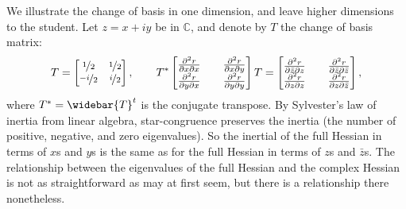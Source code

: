 \documentclass[12pt,openany]{book}
\newcommand{\C}{{\mathbb{C}}}
\theoremstyle{plain}
\theoremstyle{remark}
\theoremstyle{definition}
\theoremstyle{exercise}
\theoremstyle{example}
\begin{document}
We illustrate the change of basis in one dimension, and leave higher
dimensions to the student.  Let $z =
x+iy$ be in $\C$, and denote by $T$ the change of basis matrix:
\begin{equation*}
T =
\begin{bmatrix}
\nicefrac{1}{2} & \nicefrac{1}{2} \\
\nicefrac{-i}{2} & \nicefrac{i}{2}
\end{bmatrix}
,
\qquad
T^*
\begin{bmatrix}
\frac{\partial^2 r}{\partial x \partial x} &&
\frac{\partial^2 r}{\partial x \partial y}
\\
\frac{\partial^2 r}{\partial y \partial x} &&
\frac{\partial^2 r}{\partial y \partial y}
\end{bmatrix}
T
=
\begin{bmatrix}
\frac{\partial^2 r}{\partial \bar{z} \partial z} &&
\frac{\partial^2 r}{\partial \bar{z} \partial \bar{z}}
\\
\frac{\partial^2 r}{\partial z \partial z} &&
\frac{\partial^2 r}{\partial z \partial \bar{z}}
\end{bmatrix}
,
\end{equation*}
where
%
$T^* = \widebar{T}^t$ is the conjugate transpose.
By Sylvester's law of inertia from linear algebra, star-congruence
preserves the inertia (the number of positive, negative, and zero
eigenvalues).  So the
inertial of the full Hessian in terms of $x$s and $y$s is the same
as for the full Hessian in terms of $z$s and $\bar{z}$s.
The relationship between the eigenvalues of the full Hessian and the complex
Hessian is not as straightforward as may at first seem, but there is
a relationship there nonetheless.
\end{document}
